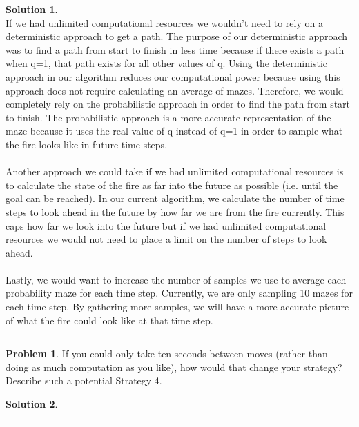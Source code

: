 \documentclass{article}
\theoremstyle{definition}
\newtheorem{problem}{Problem}
\def\fline{\rule{0.75\linewidth}{0.5pt}}
\newcommand{\finishline}{\vspace{-15pt}\begin{center}\fline\end{center}}
\newtheorem*{solution*}{Solution}
\newenvironment{solution}{\begin{solution*}}{{\finishline} \end{solution*}}
\begin{document}
\begin{solution} \hfill \\
	If we had unlimited computational resources we wouldn't need to rely on a deterministic approach to get a path. The purpose of our deterministic approach was to find a path from start to finish in less time because if there exists a path when q=1, that path exists for all other values of q. Using the deterministic approach in our algorithm reduces our computational power because using this approach does not require calculating an average of mazes. Therefore, we would completely rely on the probabilistic approach in order to find the path from start to finish. The probabilistic approach is a more accurate representation of the maze because it uses the real value of q instead of q=1 in order to sample what the fire looks like in future time steps. \\ \\
	Another approach we could take if we had unlimited computational resources is to calculate the state of the fire as far into the future as possible (i.e. until the goal can be reached). In our current algorithm, we calculate the number of time steps to look ahead in the future by how far we are from the fire currently. This caps how far we look into the future but if we had unlimited computational resources we would not need to place a limit on the number of steps to look ahead. \\ \\
    Lastly, we would want to increase the number of samples we use to average each probability maze for each time step. Currently, we are only sampling 10 mazes for each time step. By gathering more samples, we will have a more accurate picture of what the fire could look like at that time step. \\
\end{solution}

\smallskip

\begin{problem}
	If you could only take ten seconds between moves (rather than doing as much computation as you like), how would that change your strategy? Describe such a potential Strategy 4.
\end{problem}

\smallskip

\begin{solution} \hfill \\
	 
\end{solution}

\smallskip
\end{document}
